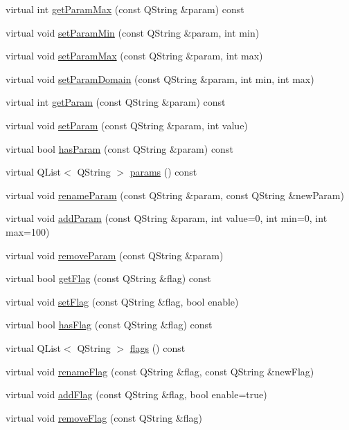 \begin{DoxyCompactItemize}
\item 
virtual int \hyperlink{class_game_object_a714857ae1ea08935b8beb76675db33e8}{get\-Param\-Max} (const \-Q\-String \&param) const 
\item 
virtual void \hyperlink{class_game_object_a369445e39ff040b9051e6e003a45fbbb}{set\-Param\-Min} (const \-Q\-String \&param, int min)
\item 
virtual void \hyperlink{class_game_object_a6c8131b466e418f796450cdbb0e81cce}{set\-Param\-Max} (const \-Q\-String \&param, int max)
\item 
virtual void \hyperlink{class_game_object_afaa71b1cb878ba95f10a13ad4e67af2b}{set\-Param\-Domain} (const \-Q\-String \&param, int min, int max)
\item 
virtual int \hyperlink{class_game_object_a4c9a0568afb851340b513207c9745734}{get\-Param} (const \-Q\-String \&param) const 
\item 
virtual void \hyperlink{class_game_object_a2cd8c2defab5b5327a65253b2a6773b9}{set\-Param} (const \-Q\-String \&param, int value)
\item 
virtual bool \hyperlink{class_game_object_ae5272e52ab14e5d87616a5dcaeb62919}{has\-Param} (const \-Q\-String \&param) const 
\item 
virtual \-Q\-List$<$ \-Q\-String $>$ \hyperlink{class_game_object_a1ef02d136f04abe43628035486dfc254}{params} () const 
\item 
virtual void \hyperlink{class_game_object_aec5d03f0a7f5d3807b10f3629c1fd146}{rename\-Param} (const \-Q\-String \&param, const \-Q\-String \&new\-Param)
\item 
virtual void \hyperlink{class_game_object_a5cbbbaebcc0204b466f79c1e6734c864}{add\-Param} (const \-Q\-String \&param, int value=0, int min=0, int max=100)
\item 
virtual void \hyperlink{class_game_object_a2f406df8dd674455ccc9505dc1746f61}{remove\-Param} (const \-Q\-String \&param)
\item 
virtual bool \hyperlink{class_game_object_ac1df89c8a28a491e1cfd102dcbd044d7}{get\-Flag} (const \-Q\-String \&flag) const 
\item 
virtual void \hyperlink{class_game_object_aeefd55b81985ac441c9778de200111d0}{set\-Flag} (const \-Q\-String \&flag, bool enable)
\item 
virtual bool \hyperlink{class_game_object_af741fb2fb5e879041c2bd95de4156eb6}{has\-Flag} (const \-Q\-String \&flag) const 
\item 
virtual \-Q\-List$<$ \-Q\-String $>$ \hyperlink{class_game_object_aa4e80649831f355c14f35f0f9374c691}{flags} () const 
\item 
virtual void \hyperlink{class_game_object_a949ff1c62139b7f41142cc13482357e6}{rename\-Flag} (const \-Q\-String \&flag, const \-Q\-String \&new\-Flag)
\item 
virtual void \hyperlink{class_game_object_ad466ce6d9d70cf2d9127e43113f1de0a}{add\-Flag} (const \-Q\-String \&flag, bool enable=true)
\item 
virtual void \hyperlink{class_game_object_a56d6296edaf45ff99cb03be0598a7c69}{remove\-Flag} (const \-Q\-String \&flag)
\end{DoxyCompactItemize}
